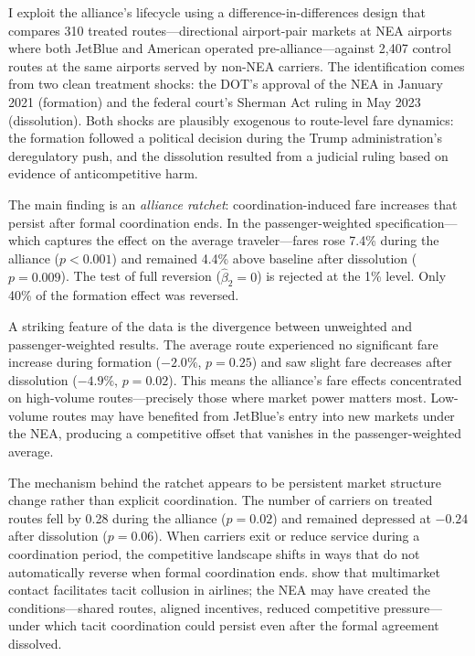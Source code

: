 \documentclass[12pt]{article}
\begin{document}
I exploit the alliance's lifecycle using a difference-in-differences design that compares 310 treated routes---directional airport-pair markets at NEA airports where both JetBlue and American operated pre-alliance---against 2,407 control routes at the same airports served by non-NEA carriers. The identification comes from two clean treatment shocks: the DOT's approval of the NEA in January 2021 (formation) and the federal court's Sherman Act ruling in May 2023 (dissolution). Both shocks are plausibly exogenous to route-level fare dynamics: the formation followed a political decision during the Trump administration's deregulatory push, and the dissolution resulted from a judicial ruling based on evidence of anticompetitive harm.

The main finding is an \textit{alliance ratchet}: coordination-induced fare increases that persist after formal coordination ends. In the passenger-weighted specification---which captures the effect on the average traveler---fares rose 7.4\% during the alliance ($p < 0.001$) and remained 4.4\% above baseline after dissolution ($p = 0.009$). The test of full reversion ($\hat{\beta}_2 = 0$) is rejected at the 1\% level. Only 40\% of the formation effect was reversed.

A striking feature of the data is the divergence between unweighted and passenger-weighted results. The average route experienced no significant fare increase during formation ($-2.0\%$, $p = 0.25$) and saw slight fare decreases after dissolution ($-4.9\%$, $p = 0.02$). This means the alliance's fare effects concentrated on high-volume routes---precisely those where market power matters most. Low-volume routes may have benefited from JetBlue's entry into new markets under the NEA, producing a competitive offset that vanishes in the passenger-weighted average.

The mechanism behind the ratchet appears to be persistent market structure change rather than explicit coordination. The number of carriers on treated routes fell by 0.28 during the alliance ($p = 0.02$) and remained depressed at $-0.24$ after dissolution ($p = 0.06$). When carriers exit or reduce service during a coordination period, the competitive landscape shifts in ways that do not automatically reverse when formal coordination ends. \citet{ciliberto2014} show that multimarket contact facilitates tacit collusion in airlines; the NEA may have created the conditions---shared routes, aligned incentives, reduced competitive pressure---under which tacit coordination could persist even after the formal agreement dissolved.
\end{document}
